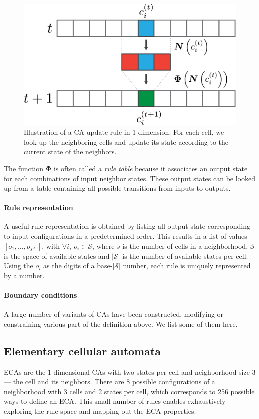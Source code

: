 \begin{figure}[htbp]
  \centering
 \includegraphics[width=.7\linewidth]{figures/ca_base}
  \caption{Illustration of a \acl{CA} update rule in 1 dimension. For each cell,
  we look up the neighboring cells and update its state according to the current
state of the neighbors.}
  \label{fig:ca_base}
\end{figure}

The function $\boldsymbol{\Phi}$ is often called a \emph{rule table} because it
associates an output state for each combinations of input neighbor states. These
output states can be looked up from a table containing all possible transitions
from inputs to outputs.

\paragraph{Rule representation}
A useful rule representation is obtained by listing all output state
corresponding to input configurations in a predetermined order. This results in
a list of values $[o_1, \ldots, o_{s^{|\mathcal{S}|}}]$, with $\forall i,\ o_{i} \in \mathcal{S}$, where $s$ is
the number of cells in a neighborhood, $\mathcal{S}$ is the space of available states and
$|\mathcal{S}|$ is the number of available states per cell. Using the $o_{i}$ as the
digits of a base-$|\mathcal{S}|$ number, each rule is uniquely represented by a number.

\paragraph{Boundary conditions}

A large number of variants of \acp{CA} have been constructed, modifying or
constraining various part of the definition above. We list some of them here.

\subsection{Elementary cellular automata}
\Acp{ECA} are the 1 dimensional \acp{CA} with two states per cell and
neighborhood size 3 --- the cell and its neighbors. There are 8 possible
configurations of a neighborhood with 3 cells and 2 states per cell, which
corresponds to 256 possible ways to define an \ac{ECA}. This small number of
rules enables exhaustively exploring the rule space and mapping out the \ac{ECA}
properties.

